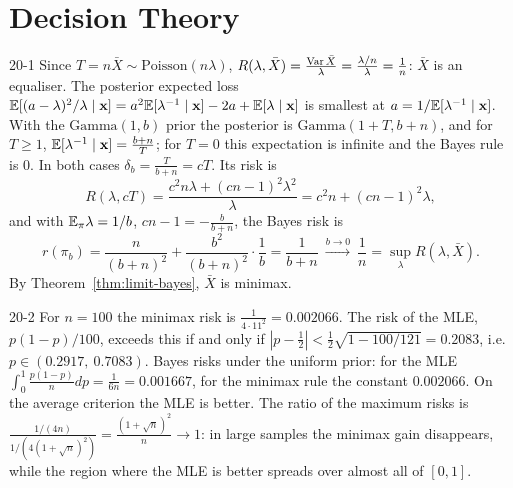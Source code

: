 
\section{Decision Theory}

\begin{solution}{20-1}
Since $T=n\bar X\sim\text{Poisson}(n\lambda)$, $R(\lambda,\bar X)=\frac{\operatorname{Var}\bar X}{\lambda}=\frac{\lambda/n}{\lambda}=\frac1n$: $\bar X$ is an equaliser. The posterior expected loss $\mathbb{E}[(a-\lambda)^2/\lambda\mid\mathbf{x}]=a^2\mathbb{E}[\lambda^{-1}\mid\mathbf{x}]-2a+\mathbb{E}[\lambda\mid\mathbf{x}]$ is smallest at $a=1/\mathbb{E}[\lambda^{-1}\mid\mathbf{x}]$. With the $\text{Gamma}(1,b)$ prior the posterior is $\text{Gamma}(1+T,b+n)$, and for $T\ge1$, $\mathbb{E}[\lambda^{-1}\mid\mathbf{x}]=\frac{b+n}{T}$; for $T=0$ this expectation is infinite and the Bayes rule is $0$. In both cases $\delta_b=\frac{T}{b+n}=cT$. Its risk is
\[
R(\lambda,cT)=\frac{c^2n\lambda+(cn-1)^2\lambda^2}{\lambda}=c^2n+(cn-1)^2\lambda,
\]
and with $\mathbb{E}_\pi\lambda=1/b$, $cn-1=-\frac{b}{b+n}$, the Bayes risk is
\[
r(\pi_b)=\frac{n}{(b+n)^2}+\frac{b^2}{(b+n)^2}\cdot\frac1b=\frac1{b+n}\ \xrightarrow{b\to0}\ \frac1n=\sup_\lambda R(\lambda,\bar X).
\]
By Theorem~\ref{thm:limit-bayes}, $\bar X$ is minimax.
\end{solution}

\begin{solution}{20-2}
For $n=100$ the minimax risk is $\frac1{4\cdot11^2}=0.002066$. The risk of the MLE, $p(1-p)/100$, exceeds this if and only if $|p-\frac12|<\frac12\sqrt{1-100/121}=0.2083$, i.e.\ $p\in(0.2917,\ 0.7083)$. Bayes risks under the uniform prior: for the MLE $\int_0^1\frac{p(1-p)}{n}dp=\frac1{6n}=0.001667$, for the minimax rule the constant $0.002066$. On the average criterion the MLE is better. The ratio of the maximum risks is $\frac{1/(4n)}{1/(4(1+\sqrt n)^2)}=\frac{(1+\sqrt n)^2}{n}\to1$: in large samples the minimax gain disappears, while the region where the MLE is better spreads over almost all of $[0,1]$.
\end{solution}

